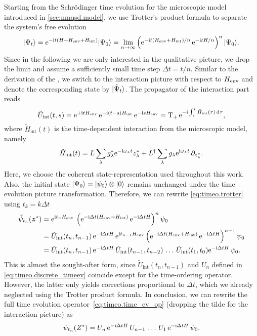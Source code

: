 Starting from the Schrödinger time evolution for the microscopic model introduced in \autoref{sec:nmqsd.model}, we use Trotter's product formula to separate the system's free evolution
\begin{equation}
  \ket{\Psi_t} = \exp[-\ii t (\Hsys + \Henv + \Hint) ]\ket{\Psi_0} = \lim_{n\to\infty} \left( \exp[-\ii t (\Henv + \Hint) / n] \, \exp[-\ii t \Hsys / n] \right)^n \ket{\Psi_0}.
  \label{eq:timeo.trotter}
\end{equation}
Since in the following we are only interested in the qualitative picture, we drop the limit and assume a sufficiently small time step $\Delta t = t / n$.
Similar to the derivation of the \NMSSE, we switch to the interaction picture with respect to $H_\mathrm{env}$ and denote the corresponding state by $| \tilde\Psi_t \rangle$.
The propagator of the interaction part reads
\begin{equation*}
  \tilde U_\mathrm{int}(t, s) = \exp[+\ii t \Henv] \, \exp[-\ii(t - s) \Hint] \, \exp[-\ii s \Henv] = \Texp[-\ii\int_s^t \tilde H_\mathrm{int}(\tau) \dd \tau],
\end{equation*}
where $\tilde H_\mathrm{int}(t)$ is the time-dependent interaction from the microscopic model, namely
\begin{equation}
  \tilde H_\mathrm{int}(t) = L \sum_\lambda \cc g_\lambda \exp[-\ii\omega_\lambda t] \cc z_\lambda + \adj{L} \sum_\lambda g_\lambda \exp[\ii\omega_\lambda t] \, \partial_{\cc z_\lambda}.
  \label{eq:timeo.hint}
\end{equation}
Here, we choose the coherent state-representation used throughout this work.
Also, the initial state $| \Psi_0 \rangle = | \psi_0 \rangle \otimes | 0 \rangle$ remains unchanged under the time evolution picture transformation.
Therefore, we can rewrite \autoref{eq:timeo.trotter} using $t_k = k \Delta t$
\begin{align*}
  \tilde \psi_{t_n}(\cc\zz) &= \exp[\ii t_n \Henv] \, \left( \exp[-\ii \Delta t (\Henv + \Hint)] \, \exp[-\ii \Delta t \Hsys] \right)^n \psi_0 \\
  &= \tilde U_\mathrm{int}(t_n, t_{n-1}) \, \exp[-\ii \Delta t \Hsys] \, \exp[\ii t_{n-1} \Henv] \left( \exp[-\ii \Delta t (\Henv + \Hint)] \, \exp[-\ii \Delta t \Hsys] \right)^{n-1} \psi_0 \\
  &= \tilde U_\mathrm{int}(t_n, t_{n-1}) \, \exp[-\ii \Delta t \Hsys] \, \tilde U_\mathrm{int}(t_{n-1}, t_{n-2}) \, \ldots \, \tilde U_\mathrm{int}(t_{1}, t_{0}) \exp[-\ii \Delta t \Hsys] \,  \psi_0.
\end{align*}
This is almost the sought-after form, since $\tilde U_\mathrm{int}(t_n, t_{n-1})$ and $U_n$ defined in \autoref{eq:timeo.discrete_timeev} coincide except for the time-ordering operator.
However, the latter only yields corrections proportional to $\Delta t$, which we already neglected using the Trotter product formula.
In conclusion, we can rewrite the full time evolution operator~\ref{eq:timeo.time_ev_op} (dropping the tilde for the interaction-picture) as
\begin{equation}
  \psi_{t_n}(\ZZ) = U_n \, \exp[-\ii \Delta t \Hsys] \, U_{n-1} \, \ldots \, U_1 \,  \exp[-\ii \Delta t \Hsys] \,\psi_0.
  \label{eq:timeo.final}
\end{equation}


